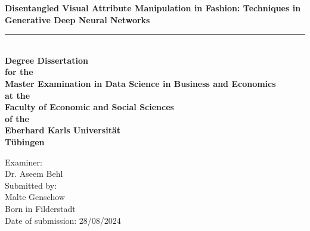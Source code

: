 \clearpage

\begin{center}
\vspace*{2cm}

\Large\textbf{Disentangled Visual Attribute Manipulation in Fashion:
Techniques in Generative Deep Neural Networks}\\[0.5cm]
\rule{13cm}{0.4pt}\\[1.5cm]

\large\textbf{Degree Dissertation\\
for the\\
Master Examination in Data Science in Business and Economics\\
at the\\
Faculty of Economic and Social Sciences\\
of the\\
Eberhard Karls Universität\\
Tübingen}\\[2cm]
\end{center}

\begin{flushright}
Examiner:\\
Dr. Aseem Behl\\[1.5cm]

Submitted by:\\
Malte Genschow\\
Born in Filderstadt\\[1.5cm]

Date of submission: 28/08/2024\\
\end{flushright}

\thispagestyle{empty}
\setcounter{page}{0}

\newpage